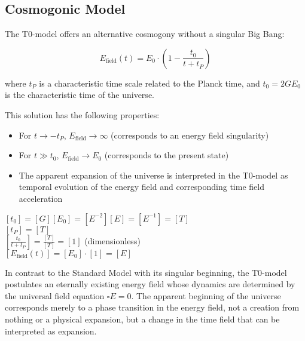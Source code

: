 \documentclass[12pt,a4paper]{article}
\theoremstyle{definition}
\begin{document}
	\subsection{Cosmogonic Model}
	
	The T0-model offers an alternative cosmogony without a singular Big Bang:
	
	\begin{equation}
		E_{\text{field}}(t) = E_0 \cdot \left(1 - \frac{t_0}{t + t_P}\right)
	\end{equation}
	
	where $t_P$ is a characteristic time scale related to the Planck time, and $t_0 = 2GE_0$ is the characteristic time of the universe.
	
	This solution has the following properties:
	\begin{itemize}
		\item For $t \to -t_P$, $E_{\text{field}} \to \infty$ (corresponds to an energy field singularity)
		\item For $t \gg t_0$, $E_{\text{field}} \to E_0$ (corresponds to the present state)
		\item The apparent expansion of the universe is interpreted in the T0-model as temporal evolution of the energy field and corresponding time field acceleration
	\end{itemize}
	
	\begin{einheitencheck}
		$[t_0] = [G][E_0] = [E^{-2}][E] = [E^{-1}] = [T]$ \checkmark\\
		$[t_P] = [T]$ \checkmark\\
		$[\frac{t_0}{t + t_P}] = \frac{[T]}{[T]} = [1]$ (dimensionless) \checkmark\\
		$[E_{\text{field}}(t)] = [E_0] \cdot [1] = [E]$ \checkmark
	\end{einheitencheck}
	
	\begin{wichtig}
		In contrast to the Standard Model with its singular beginning, the T0-model postulates an eternally existing energy field whose dynamics are determined by the universal field equation $\square E = 0$. The apparent beginning of the universe corresponds merely to a phase transition in the energy field, not a creation from nothing or a physical expansion, but a change in the time field that can be interpreted as expansion.
	\end{wichtig}
	
\end{document}
